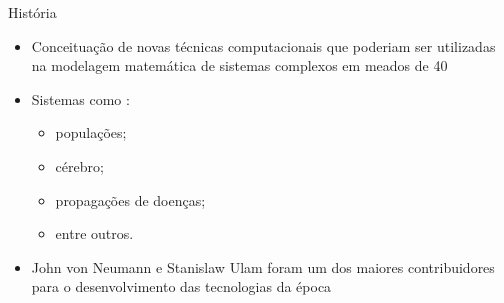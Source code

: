 \documentclass[compress, hide notes]{beamer}
\begin{document}
\begin{frame}{História \cite{ufmg}}
	
	\begin{itemize}
 		\setlength\itemsep{12pt}
	
		\item Conceituação de novas técnicas computacionais que poderiam ser utilizadas na modelagem matemática de sistemas complexos em meados de 40
        
        \item Sistemas como \cite{ufmg}:
        
        \begin{itemize}
 			\setlength\itemsep{6pt}
        	\item populações;
            \item cérebro;
            \item propagações de doenças;
           	\item entre outros.
        \end{itemize}
		
		\item John von Neumann e Stanislaw Ulam foram um dos maiores contribuidores para o desenvolvimento das tecnologias da época \cite{neumann}
			
	\end{itemize}
\end{frame}
\end{document}
